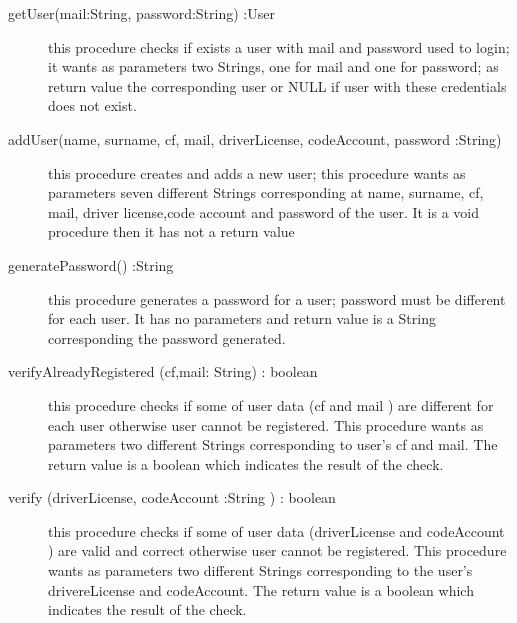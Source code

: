 \documentclass{scrreprt}
\begin{document}
\begin{description}
\item[getUser(mail:String, password:String) :User] this procedure checks if exists a user with mail and password used to login; it wants as parameters two Strings, one for mail and one for password; as return value the corresponding user or NULL if user with these credentials does not exist.
\item[addUser(name, surname, cf, mail, driverLicense, codeAccount, password :String)] this procedure creates and adds a new user; this procedure wants as parameters seven different Strings corresponding at name, surname, cf, mail, driver license,code account and password of the user. It is a void procedure then it has not a return value
\item[generatePassword() :String] this procedure generates a password for a user; password must be different for each user. It has no parameters and return value is a String corresponding the password generated.
\item[verifyAlreadyRegistered (cf,mail: String) : boolean] this procedure checks if some of user data (cf and mail ) are different for each user otherwise user cannot be registered. This procedure wants as parameters two different Strings corresponding to user's cf and mail. The return value is a boolean which indicates the result of the check.
\item[verify (driverLicense, codeAccount :String ) : boolean] this procedure checks if some of user data (driverLicense and codeAccount ) are valid and correct otherwise user cannot be registered. This procedure wants as parameters two different Strings corresponding to the user's drivereLicense and codeAccount. The return value is a boolean which indicates the result of the check.
\end{description}
\end{document}
